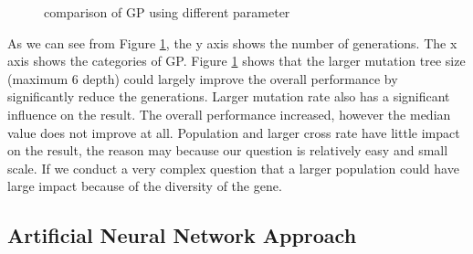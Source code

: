 \documentclass[11pt, a4paper, oneside, openright]{article}
\begin{document}
  \begin{figure}[!ht]
  \centerline{}
  \caption{comparison of GP using different parameter}
  \label{fig:comparison}
  \end{figure}

As we can see from Figure \ref{fig:comparison}, the y axis shows the number of generations. The x axis shows the categories of GP. Figure \ref{fig:comparison} shows that the larger mutation tree size (maximum 6 depth) could largely improve the overall performance by significantly reduce the generations. Larger mutation rate also has a significant influence on the result. The overall performance increased, however the median value does not improve at all. Population and larger cross rate have little impact on the result, the reason may because our question is relatively easy and small scale. If we conduct a very complex question that a larger population could have large impact because of the diversity of the gene.


\subsection{Artificial Neural Network Approach}
\end{document}
